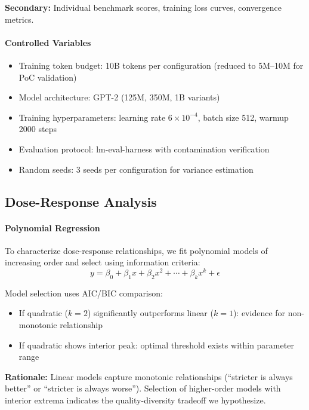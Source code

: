 \textbf{Secondary:} Individual benchmark scores, training loss curves, convergence metrics.

\paragraph{Controlled Variables}
\begin{itemize}
    \item Training token budget: 10B tokens per configuration (reduced to 5M--10M for PoC validation)
    \item Model architecture: GPT-2 (125M, 350M, 1B variants)
    \item Training hyperparameters: learning rate $6 \times 10^{-4}$, batch size 512, warmup 2000 steps
    \item Evaluation protocol: lm-eval-harness with contamination verification
    \item Random seeds: 3 seeds per configuration for variance estimation
\end{itemize}

\subsection{Dose-Response Analysis}

\paragraph{Polynomial Regression}
To characterize dose-response relationships, we fit polynomial models of increasing order and select using information criteria:
\begin{equation}
y = \beta_0 + \beta_1 x + \beta_2 x^2 + \cdots + \beta_k x^k + \epsilon
\end{equation}

Model selection uses AIC/BIC comparison:
\begin{itemize}
    \item If quadratic ($k=2$) significantly outperforms linear ($k=1$): evidence for non-monotonic relationship
    \item If quadratic shows interior peak: optimal threshold exists within parameter range
\end{itemize}

\textbf{Rationale:} Linear models capture monotonic relationships (``stricter is always better'' or ``stricter is always worse''). Selection of higher-order models with interior extrema indicates the quality-diversity tradeoff we hypothesize.

